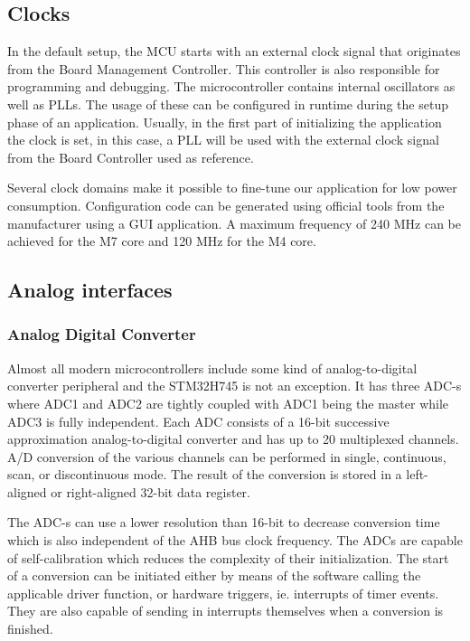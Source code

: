 \subsection{Clocks}

In the default setup, the MCU starts with an external clock signal that originates from the Board Management Controller. This controller is also responsible for programming and debugging. The microcontroller contains internal oscillators as well as PLLs. The usage of these can be configured in runtime during the setup phase of an application. Usually, in the first part of initializing the application the clock is set, in this case, a PLL will be used with the external clock signal from the Board Controller used as reference.

Several clock domains make it possible to fine-tune our application for low power consumption. Configuration code can be generated using official tools from the manufacturer using a GUI application. A maximum frequency of 240 MHz can be achieved for the M7 core and 120 MHz for the M4 core.

\subsection{Analog interfaces}

\subsubsection{Analog Digital Converter}

Almost all modern microcontrollers include some kind of analog-to-digital converter peripheral and the STM32H745 is not an exception. \cite{ADCDescription} It has three ADC-s where ADC1 and ADC2 are tightly coupled with ADC1 being the master while ADC3 is fully independent. Each ADC consists of a 16-bit successive approximation analog-to-digital converter and has up to 20 multiplexed channels. A/D conversion of the various channels can be performed in single, continuous, scan, or discontinuous mode. The result of the conversion is stored in a left-aligned or right-aligned 32-bit data register.

The ADC-s can use a lower resolution than 16-bit to decrease conversion time which is also independent of the AHB bus clock frequency. The ADCs are capable of self-calibration which reduces the complexity of their initialization. The start of a conversion can be initiated either by means of the software calling the applicable driver function, or hardware triggers, ie. interrupts of timer events. They are also capable of sending in interrupts themselves when a conversion is finished.

